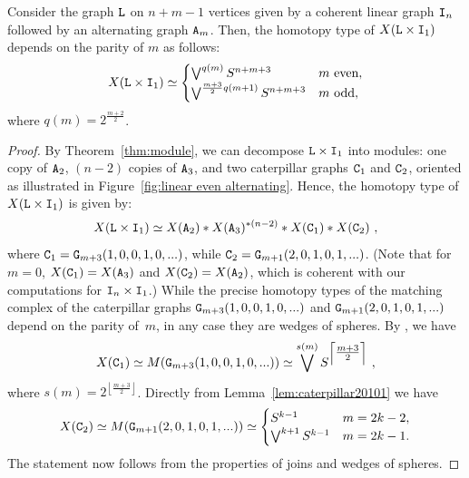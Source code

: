 \documentclass{amsart}
\begin{document}
\begin{prop}
Consider the graph ${\tt L}$ on $n+m-1$ vertices given by a coherent linear graph ${\tt I}_n$ followed by an alternating graph ${\tt A}_m$. Then, the homotopy type of $X({\tt L} \times {\tt I}_1)$ depends on the parity of $m$ as follows:
\[ X({\tt L} \times {\tt I}_1) \simeq \begin{cases}
\bigvee^{q(m)}S^{n + m + 3} & m \text{ even},\\
\bigvee^{\frac{m +3}{2}q(m+1)} S^{n + m + 3} & m \text{ odd},
\end{cases}\]
where $q(m) = 2^{\frac{m+2}{2}}$.
\end{prop}

\begin{proof}
By Theorem~\ref{thm:module}, we can decompose ${\tt L}\times {\tt I}_1$ into modules:
one copy of ${\tt A}_2$, $(n-2)$ copies of ${\tt A}_3$, and two caterpillar graphs ${\tt C}_1$ and ${\tt C}_2$, oriented as illustrated in Figure~\ref{fig:linear even alternating}. Hence, the homotopy type of $X({\tt L}\times {\tt I}_1)$ is given by:
\[
X({\tt L}\times {\tt I}_1)\simeq X({\tt A}_2)*X({\tt A}_3)^{\ast (n-2)} * X({\tt C}_1)* X({\tt C}_2) \ ,
\]
where ${\tt C}_{1} = {\tt G}_{m+3}(1,0,0,1,0,...)$, while ${\tt C}_2 = {\tt G}_{m+1}(2,0,1,0,1,...)$. (Note that for $m=0$, $X({\tt C}_1) = X({\tt A}_3)$ and $X({\tt C}_2) = X({\tt A}_2)$, which is coherent with our computations for ${\tt I}_n\times {\tt I}_1$.)
While the precise homotopy types of the matching complex of the caterpillar graphs $ {\tt G}_{m+3}(1,0,0,1,0,...)$ and ${\tt G}_{m+1}(2,0,1,0,1,...)$ depend on the parity of~$m$, in any case they are wedges of spheres. 
By \cite[Theorem~5.13]{caterpillar}, %
we have
\[X({\tt C}_1) \simeq M({\tt G}_{m+3}(1,0,0,1,0,...))\simeq  \bigvee^{s(m)}S^{\left\lceil\tfrac{m+3}{2}\right\rceil} \ , \]
where $s(m)=2^{\left\lfloor\tfrac{m+3}{2}\right\rfloor}$.
Directly from Lemma~\ref{lem:caterpillar20101} we have
\[ X({\tt C}_{2}) \simeq M({\tt G}_{m+1}(2,0,1,0,1,...))\simeq \begin{cases}
S^{k-1} & m = 2k-2,\\
\bigvee^{k+1} S^{k-1} & m = 2k - 1.
\end{cases}\]
The statement now follows from the properties of joins and  wedges of spheres.
\end{proof}
\end{document}
